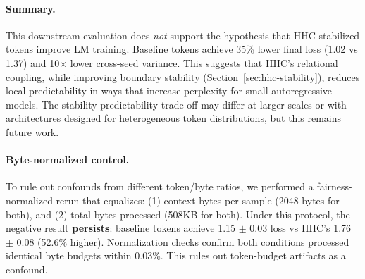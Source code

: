 \paragraph{Summary.}
This downstream evaluation does \emph{not} support the hypothesis that HHC-stabilized
tokens improve LM training. Baseline tokens achieve 35\% lower final loss (1.02 vs 1.37)
and 10$\times$ lower cross-seed variance. This suggests that HHC's relational coupling,
while improving boundary stability (Section~\ref{sec:hhc-stability}), reduces local
predictability in ways that increase perplexity for small autoregressive models.
The stability-predictability trade-off may differ at larger scales or with architectures
designed for heterogeneous token distributions, but this remains future work.

\paragraph{Byte-normalized control.}
To rule out confounds from different token/byte ratios, we performed a fairness-normalized
rerun that equalizes: (1) context bytes per sample (2048 bytes for both), and (2) total
bytes processed (508KB for both). Under this protocol, the negative result \textbf{persists}:
baseline tokens achieve 1.15 $\pm$ 0.03 loss vs HHC's 1.76 $\pm$ 0.08 (52.6\% higher).
Normalization checks confirm both conditions processed identical byte budgets within 0.03\%.
This rules out token-budget artifacts as a confound.
